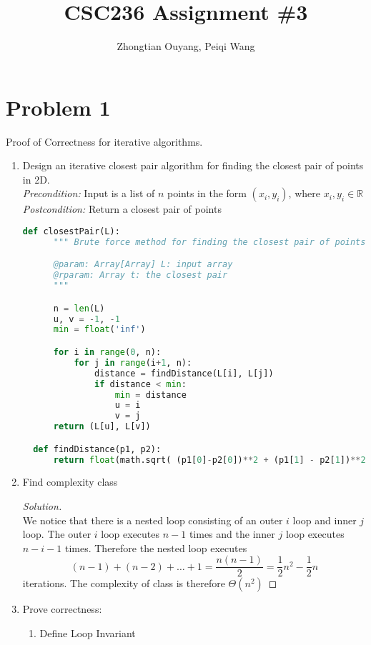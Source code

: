 \documentclass[11pt]{article}
\title{CSC236 Assignment \#3}
\author{Zhongtian Ouyang, Peiqi Wang}
\theoremstyle{plain}%
\theoremstyle{definition}
\theoremstyle{remark}
\newenvironment{solution}
  {\begin{proof}[Solution]}
  {\end{proof}}
\begin{document}
\maketitle




\section*{Problem 1}

Proof of Correctness for iterative algorithms.
\begin{enumerate}
\item Design an iterative closest pair algorithm for finding the closest pair of points in 2D.\\
\emph{Precondition:} Input is a list of $n$ points in the form $(x_i,y_i)$, where $x_i,y_i\in\mathbb{R}$\\
\emph{Postcondition:} Return a closest pair of points


\begin{lstlisting}[language=Python]
  def closestPair(L):
      """ Brute force method for finding the closest pair of points from an array L of bivariate points (x_i, y_i)

      @param: Array[Array] L: input array
      @rparam: Array t: the closest pair
      """

      n = len(L)
      u, v = -1, -1
      min = float('inf')

      for i in range(0, n):
          for j in range(i+1, n):
              distance = findDistance(L[i], L[j])
              if distance < min:
                  min = distance
                  u = i
                  v = j
      return (L[u], L[v])

  def findDistance(p1, p2):
      return float(math.sqrt( (p1[0]-p2[0])**2 + (p1[1] - p2[1])**2 ))
\end{lstlisting}


\item Find complexity class
\begin{solution}
  $ $\\
  We notice that there is a nested loop consisting of an outer $i$ loop and inner $j$ loop. The outer $i$ loop executes $n-1$ times and the inner $j$ loop executes $n-i-1$ times. Therefore the nested loop executes
  \[
    (n-1) + (n-2) + \dots + 1 = \frac{n(n-1)}{2} = \frac{1}{2}n^2 - \frac{1}{2}n
  \]
  iterations. The complexity of class is therefore $\Theta{(n^2)}$

\end{solution}
\item Prove correctness:
  \begin{enumerate}
    \item Define Loop Invariant


\end{enumerate}
\end{enumerate}
\end{document}
